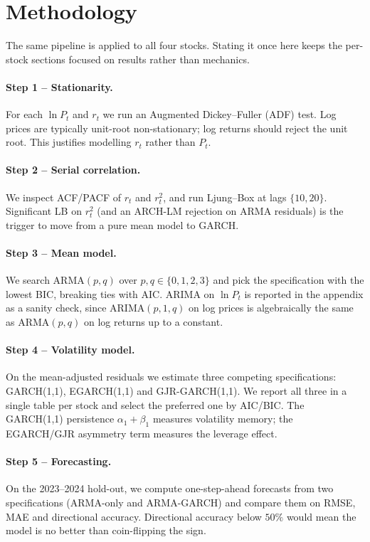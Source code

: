 \documentclass[11pt,a4paper]{article}
\begin{document}
\section{Methodology}
\label{sec:method}

The same pipeline is applied to all four stocks.  Stating it once
here keeps the per-stock sections focused on results rather than
mechanics.

\paragraph{Step 1 -- Stationarity.}
For each $\ln P_t$ and $r_t$ we run an Augmented Dickey--Fuller (ADF)
test.  Log prices are typically unit-root non-stationary; log returns
should reject the unit root.  This justifies modelling $r_t$ rather
than $P_t$.

\paragraph{Step 2 -- Serial correlation.}
We inspect ACF/PACF of $r_t$ and $r_t^{2}$, and run Ljung--Box at
lags $\{10, 20\}$.  Significant LB on $r_t^{2}$ (and an ARCH-LM
rejection on ARMA residuals) is the trigger to move from a pure mean
model to GARCH.

\paragraph{Step 3 -- Mean model.}
We search ARMA$(p,q)$ over $p,q \in \{0,1,2,3\}$ and pick the
specification with the lowest BIC, breaking ties with AIC.  ARIMA on
$\ln P_t$ is reported in the appendix as a sanity check, since
ARIMA$(p,1,q)$ on log prices is algebraically the same as ARMA$(p,q)$
on log returns up to a constant.

\paragraph{Step 4 -- Volatility model.}
On the mean-adjusted residuals we estimate three competing
specifications: GARCH(1,1), EGARCH(1,1) and GJR-GARCH(1,1).  We
report all three in a single table per stock and select the
preferred one by AIC/BIC.  The GARCH(1,1) persistence
$\alpha_1 + \beta_1$ measures volatility memory; the EGARCH/GJR
asymmetry term measures the leverage effect.

\paragraph{Step 5 -- Forecasting.}
On the 2023--2024 hold-out, we compute one-step-ahead forecasts from
two specifications (ARMA-only and ARMA-GARCH) and compare them on
RMSE, MAE and directional accuracy.  Directional accuracy below
$50\%$ would mean the model is no better than coin-flipping the
sign.
\end{document}
